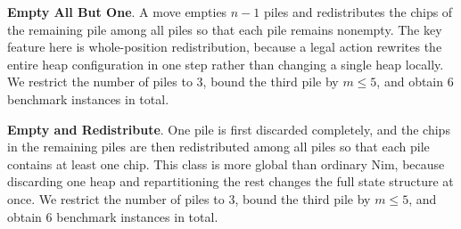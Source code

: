 \documentclass[review]{elsarticle}
\newcommand{\set}[1]{\{ #1 \}}
\newcommand{\tuple}[1]{\langle {#1} \rangle}
\newcommand{\true}{\top}
\newcommand{\statevar}{\mathcal{X}}
\newcommand{\act}{\mathcal{A}}
\newcommand{\constraint}{\mathcal{C}}
\newcommand{\estate}{\mathcal{E}}
\newcommand{\pre}{\mathtt{pre}}
\newcommand{\eff}{\mathtt{eff}}
\begin{document}
{\color{red}\textbf{Empty All But One}. A move empties $n-1$ piles and redistributes the chips of the remaining pile among all piles so that each pile remains nonempty.}
{\color{red}The key feature here is whole-position redistribution, because a legal action rewrites the entire heap configuration in one step rather than changing a single heap locally.}
{\color{red}We restrict the number of piles to $3$, bound the third pile by $m \le 5$, and obtain $6$ benchmark instances in total.}

{\color{red}\textbf{Empty and Redistribute}. One pile is first discarded completely, and the chips in the remaining piles are then redistributed among all piles so that each pile contains at least one chip.}
{\color{red}This class is more global than ordinary Nim, because discarding one heap and repartitioning the rest changes the full state structure at once.}
{\color{red}We restrict the number of piles to $3$, bound the third pile by $m \le 5$, and obtain $6$ benchmark instances in total.}
\end{document}
